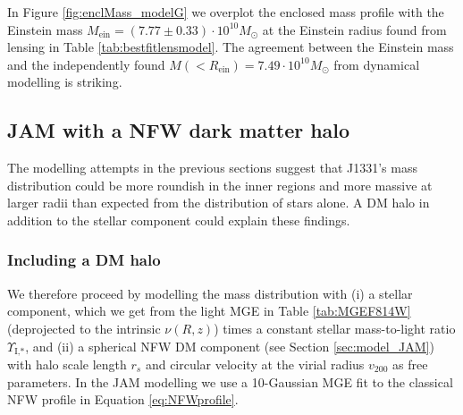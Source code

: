 \documentclass[useAMS,usenatbib]{mnras}
\begin{document}
In Figure \ref{fig:enclMass_modelG} we overplot the enclosed mass profile with the Einstein mass $M_\text{ein} = (7.77 \pm 0.33) \cdot 10^{10} M_\odot$ at the Einstein radius found from lensing in Table \ref{tab:bestfitlensmodel}. The agreement between the Einstein mass and the independently found $M(<R_\text{ein}) = 7.49 \cdot 10^{10} M_\odot$ from dynamical modelling is striking.

\subsection{JAM with a NFW dark matter halo} \label{sec:results_JAM_NFW}

The modelling attempts in the previous sections suggest that J1331's mass distribution could be more roundish in the inner regions and more massive at larger radii than expected from the distribution of stars alone. A DM halo in addition to the stellar component could explain these findings. 

\subsubsection{Including a DM halo}

We therefore proceed by modelling the mass distribution with (i) a stellar component, which we get from the light MGE in Table \ref{tab:MGEF814W} (deprojected to the intrinsic $\nu(R,z)$) times a constant stellar mass-to-light ratio $\Upsilon_\text{I,*}$, and (ii) a spherical NFW DM component (see Section \ref{sec:model_JAM}) with halo scale length $r_s$ and circular velocity at the virial radius $v_{200}$ as free parameters. In the JAM modelling we use a 10-Gaussian MGE fit to the classical NFW profile in Equation \eqref{eq:NFWprofile}.
\end{document}
